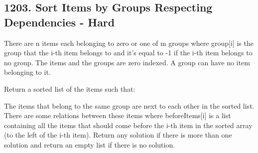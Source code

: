 \documentclass[9pt, b5paaper]{book}
\begin{document}
\subsection{1203. Sort Items by Groups Respecting Dependencies - Hard}
\label{sec-1-1-2}
There are n items each belonging to zero or one of m groups where group[i] is the group that the i-th item belongs to and it's equal to -1 if the i-th item belongs to no group. The items and the groups are zero indexed. A group can have no item belonging to it.

Return a sorted list of the items such that:

The items that belong to the same group are next to each other in the sorted list.
There are some relations between these items where beforeItems[i] is a list containing all the items that should come before the i-th item in the sorted array (to the left of the i-th item).
Return any solution if there is more than one solution and return an empty list if there is no solution.
\end{document}
